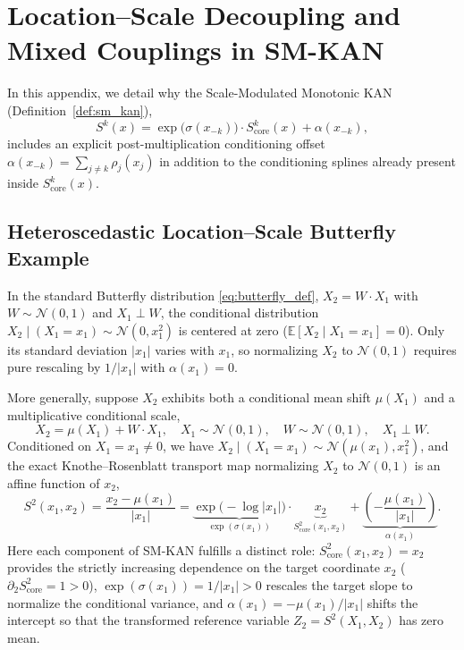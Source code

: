 \appendix

\section{Location--Scale Decoupling and Mixed Couplings in SM-KAN}
\label{app:sm_kan_location_scale}

In this appendix, we detail why the Scale-Modulated Monotonic KAN (Definition~\ref{def:sm_kan}),
\begin{equation}
    S^k(x) = \exp\big(\sigma(x_{-k})\big) \cdot S^k_{\text{core}}(x) + \alpha(x_{-k}),
\end{equation}
includes an explicit post-multiplication conditioning offset $\alpha(x_{-k}) = \sum_{j \neq k} \rho_j(x_j)$ in addition to the conditioning splines already present inside $S^k_{\text{core}}(x)$.

\subsection{Heteroscedastic Location--Scale Butterfly Example}
In the standard Butterfly distribution \eqref{eq:butterfly_def}, $X_2 = W \cdot X_1$ with $W \sim \mathcal{N}(0, 1)$ and $X_1 \perp W$, the conditional distribution $X_2 \mid (X_1 = x_1) \sim \mathcal{N}(0, x_1^2)$ is centered at zero ($\mathbb{E}[X_2 \mid X_1 = x_1] = 0$). Only its standard deviation $|x_1|$ varies with $x_1$, so normalizing $X_2$ to $\mathcal{N}(0, 1)$ requires pure rescaling by $1/|x_1|$ with $\alpha(x_1) = 0$.

More generally, suppose $X_2$ exhibits both a conditional mean shift $\mu(X_1)$ and a multiplicative conditional scale,
\begin{equation}
    X_2 = \mu(X_1) + W \cdot X_1, \quad X_1 \sim \mathcal{N}(0, 1), \quad W \sim \mathcal{N}(0, 1), \quad X_1 \perp W.
\end{equation}
Conditioned on $X_1 = x_1 \neq 0$, we have $X_2 \mid (X_1 = x_1) \sim \mathcal{N}(\mu(x_1), x_1^2)$, and the exact Knothe--Rosenblatt transport map normalizing $X_2$ to $\mathcal{N}(0, 1)$ is an affine function of $x_2$,
\begin{equation}
    S^2(x_1, x_2) = \frac{x_2 - \mu(x_1)}{|x_1|} = \underbrace{\exp\big(-\log|x_1|\big)}_{\exp(\sigma(x_1))} \cdot \underbrace{x_2}_{S^2_{\text{core}}(x_1, x_2)} + \underbrace{\left(-\frac{\mu(x_1)}{|x_1|}\right)}_{\alpha(x_1)}.
\end{equation}
Here each component of SM-KAN fulfills a distinct role: $S^2_{\text{core}}(x_1, x_2) = x_2$ provides the strictly increasing dependence on the target coordinate $x_2$ ($\partial_2 S^2_{\text{core}} = 1 > 0$), $\exp(\sigma(x_1)) = 1/|x_1| > 0$ rescales the target slope to normalize the conditional variance, and $\alpha(x_1) = -\mu(x_1)/|x_1|$ shifts the intercept so that the transformed reference variable $Z_2 = S^2(X_1, X_2)$ has zero mean.

